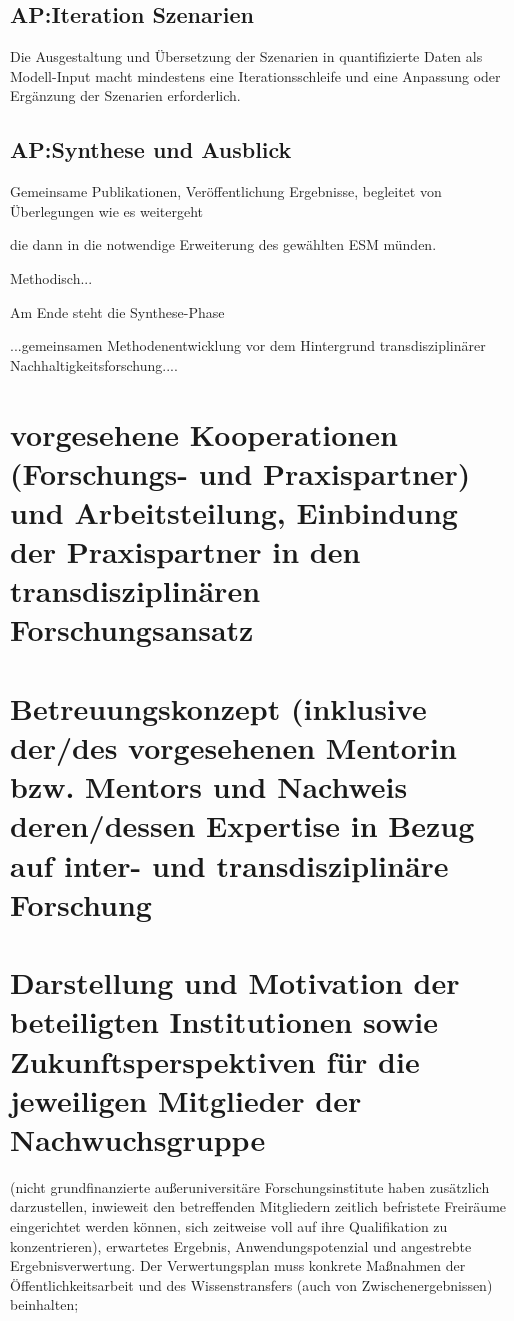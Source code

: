 \documentclass[a4paper,11pt,twoside]{scrartcl}
\begin{document}
\subsection*{AP:Iteration Szenarien}
Die Ausgestaltung und Übersetzung der Szenarien in quantifizierte Daten als Modell-Input macht mindestens eine Iterationsschleife und eine Anpassung oder Ergänzung der Szenarien erforderlich.

\subsection*{AP:Synthese und Ausblick}
Gemeinsame Publikationen, Veröffentlichung Ergebnisse, begleitet von Überlegungen wie es weitergeht


die dann in die notwendige Erweiterung des gewählten ESM münden.



Methodisch...

Am Ende steht die Synthese-Phase

...gemeinsamen Methodenentwicklung vor dem Hintergrund transdisziplinärer Nachhaltigkeitsforschung....

\section{vorgesehene Kooperationen (Forschungs- und Praxispartner) und Arbeitsteilung, Einbindung der Praxispartner in den transdisziplinären Forschungsansatz}

\section{Betreuungskonzept (inklusive der/des vorgesehenen Mentorin bzw. Mentors und Nachweis deren/dessen Expertise in Bezug auf inter- und transdisziplinäre Forschung}

\section{Darstellung und Motivation der beteiligten Institutionen sowie Zukunftsperspektiven für die jeweiligen Mitglieder der Nachwuchsgruppe}
(nicht grundfinanzierte außeruniversitäre Forschungsinstitute haben zusätzlich darzustellen, ­inwieweit den betreffenden Mitgliedern zeitlich befristete Freiräume eingerichtet werden können, sich zeitweise voll auf ihre Qualifikation zu konzentrieren), erwartetes Ergebnis, Anwendungspotenzial und angestrebte Ergebnisverwertung. Der Verwertungsplan muss konkrete Maßnahmen der Öffentlichkeitsarbeit und des Wissenstransfers (auch von Zwischenergebnissen) beinhalten;
\end{document}
